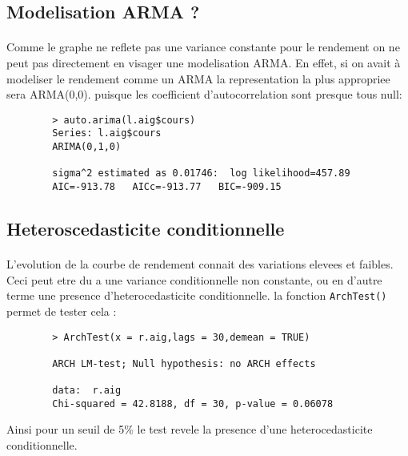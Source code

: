    \subsection{Modelisation ARMA ?}       
        \paragraph{} Comme le graphe ne reflete pas une variance
        constante pour le rendement on ne peut pas directement en
        visager une modelisation ARMA. En effet, si on avait à modeliser
        le rendement comme un ARMA la representation la plus appropriee
        sera ARMA(0,0). puisque les coefficient
        d'autocorrelation sont presque tous null:
        \begin{verbatim}
        > auto.arima(l.aig$cours)
        Series: l.aig$cours 
        ARIMA(0,1,0)                    

        sigma^2 estimated as 0.01746:  log likelihood=457.89
        AIC=-913.78   AICc=-913.77   BIC=-909.15
        \end{verbatim}






    \subsection{Heteroscedasticite conditionnelle}
        \paragraph{}L'evolution de la courbe de rendement connait des variations elevees 
        et faibles. Ceci peut etre du a une variance conditionnelle non
        constante, ou en d'autre terme une presence d'heterocedasticite
        conditionnelle. la fonction \verb+ArchTest()+ permet de tester cela
        :
        \begin{verbatim}
        > ArchTest(x = r.aig,lags = 30,demean = TRUE)

        ARCH LM-test; Null hypothesis: no ARCH effects

        data:  r.aig
        Chi-squared = 42.8188, df = 30, p-value = 0.06078
        \end{verbatim}
        Ainsi pour un seuil de 5\% le test revele la presence d'une
        heterocedasticite conditionnelle.







